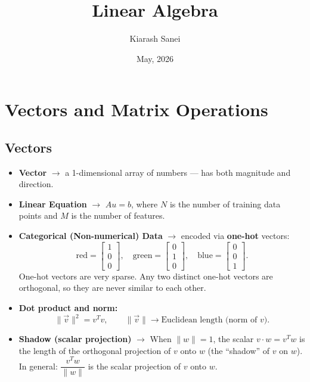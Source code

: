 \documentclass[hidelinks]{article}
\title{\color{carminered}\textbf{Linear Algebra}}
\author{\color{Thistle}Kiarash Sanei}
\date{\color{SkyBlue}May, 2026}
\begin{document}
\hypersetup{bookmarksnumbered=true}
\pagecolor{black}
\color{white}
\maketitle

\begin{Large}
\tableofcontents
\end{Large}
\pagebreak

\section{Vectors and Matrix Operations}

\subsection{Vectors}
\begin{itemize}
    \item \textbf{Vector} $\rightarrow$ a 1-dimensional array of numbers — has both magnitude and direction.
    \item \textbf{Linear Equation} $\rightarrow$ $Au = b$, where $N$ is the number of training data points and $M$ is the number of features.
    \item \textbf{Categorical (Non-numerical) Data} $\rightarrow$ encoded via \textbf{one-hot} vectors:
    \[
        \text{red} = \begin{bmatrix}1\\0\\0\end{bmatrix},\quad
        \text{green} = \begin{bmatrix}0\\1\\0\end{bmatrix},\quad
        \text{blue} = \begin{bmatrix}0\\0\\1\end{bmatrix}.
    \]
    One-hot vectors are very sparse. Any two distinct one-hot vectors are orthogonal, so they are never similar to each other.
    \item \textbf{Dot product and norm:}
    \[
        \|\vec{v}\|^2 = v^T v, \qquad \|\vec{v}\| \rightarrow \text{Euclidean length (norm of } v\text{)}.
    \]
    \item \textbf{Shadow (scalar projection)} $\rightarrow$ When $\|w\| = 1$, the scalar $v \cdot w = v^T w$ is the length of the orthogonal projection of $v$ onto $w$ (the ``shadow'' of $v$ on $w$).
    In general: $\dfrac{v^T w}{\|w\|}$ is the scalar projection of $v$ onto $w$.
\end{itemize}
\end{document}
